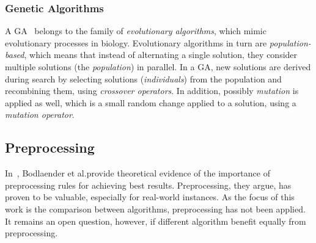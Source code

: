 \documentclass[thesis.tex]{subfiles}
\begin{document}
\subsubsection{Genetic Algorithms}
   \label{GA}
%
A \gls{GA}~\parencite{sorensen2013metaheuristics} belongs to the family of \emph{evolutionary algorithms}, which mimic evolutionary processes in biology. Evolutionary algorithms in turn are \emph{population-based}, which means that instead of alternating a single solution, they consider multiple solutions (the \emph{population}) in parallel. In a \gls{GA}, new solutions are derived during search by selecting solutions (\emph{individuals}) from the population and recombining them, using \emph{crossover operators}. In addition, possibly \emph{mutation} is applied as well, which is a small random change applied to a solution, using a \emph{mutation operator}.




\subsection{Preprocessing}
In~\parencite{bodlaender-preprocessing}, Bodlaender et al.\@ provide theoretical evidence of the importance of preprocessing rules for achieving best results. Preprocessing, they argue, has proven to be valuable, especially for real-world instances. As the focus of this work is the comparison between algorithms, preprocessing has not been applied. It remains an open question, however, if different algorithm benefit equally from preprocessing.
\end{document}
